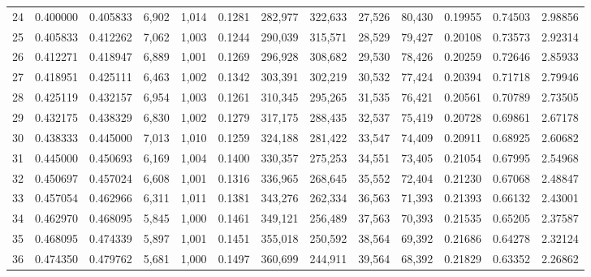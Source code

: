 \begin{tabular}{rrrrrrrrrrrrr}
24  &  0.400000 &  0.405833 &   6,902 &  1,014 &                                     0.1281 &  282,977 &  322,633 &   27,526 &   80,430 &  0.19955 &  0.74503 &  2.98856 \\
25  &  0.405833 &  0.412262 &   7,062 &  1,003 &                                     0.1244 &  290,039 &  315,571 &   28,529 &   79,427 &  0.20108 &  0.73573 &  2.92314 \\
26  &  0.412271 &  0.418947 &   6,889 &  1,001 &                                     0.1269 &  296,928 &  308,682 &   29,530 &   78,426 &  0.20259 &  0.72646 &  2.85933 \\
27  &  0.418951 &  0.425111 &   6,463 &  1,002 &                                     0.1342 &  303,391 &  302,219 &   30,532 &   77,424 &  0.20394 &  0.71718 &  2.79946 \\
28  &  0.425119 &  0.432157 &   6,954 &  1,003 &                                     0.1261 &  310,345 &  295,265 &   31,535 &   76,421 &  0.20561 &  0.70789 &  2.73505 \\
29  &  0.432175 &  0.438329 &   6,830 &  1,002 &                                     0.1279 &  317,175 &  288,435 &   32,537 &   75,419 &  0.20728 &  0.69861 &  2.67178 \\
30  &  0.438333 &  0.445000 &   7,013 &  1,010 &                                     0.1259 &  324,188 &  281,422 &   33,547 &   74,409 &  0.20911 &  0.68925 &  2.60682 \\
31  &  0.445000 &  0.450693 &   6,169 &  1,004 &                                     0.1400 &  330,357 &  275,253 &   34,551 &   73,405 &  0.21054 &  0.67995 &  2.54968 \\
32  &  0.450697 &  0.457024 &   6,608 &  1,001 &                                     0.1316 &  336,965 &  268,645 &   35,552 &   72,404 &  0.21230 &  0.67068 &  2.48847 \\
33  &  0.457054 &  0.462966 &   6,311 &  1,011 &                                     0.1381 &  343,276 &  262,334 &   36,563 &   71,393 &  0.21393 &  0.66132 &  2.43001 \\
34  &  0.462970 &  0.468095 &   5,845 &  1,000 &                                     0.1461 &  349,121 &  256,489 &   37,563 &   70,393 &  0.21535 &  0.65205 &  2.37587 \\
35  &  0.468095 &  0.474339 &   5,897 &  1,001 &                                     0.1451 &  355,018 &  250,592 &   38,564 &   69,392 &  0.21686 &  0.64278 &  2.32124 \\
36  &  0.474350 &  0.479762 &   5,681 &  1,000 &                                     0.1497 &  360,699 &  244,911 &   39,564 &   68,392 &  0.21829 &  0.63352 &  2.26862 \\

\end{tabular}
